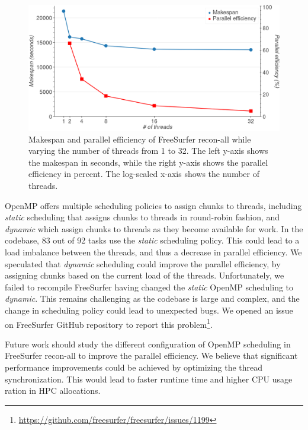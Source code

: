 \documentclass[conference]{IEEEtran}
\begin{document}
\begin{figure}
	\includegraphics[width=\linewidth]{figures/makespan-freesurfer.png}
	\caption{Makespan and parallel efficiency of FreeSurfer recon-all while varying the number of threads from 1 to 32. The left y-axis shows the makespan in seconds, while the right y-axis shows the parallel efficiency in percent. The log-scaled x-axis shows the number of threads.}
	\label{fig:freesurfer-threading}
\end{figure}

OpenMP offers multiple scheduling policies to assign chunks to threads, including \textit{static} scheduling that assigns chunks to threads in round-robin fashion, and \textit{dynamic} which assign chunks to threads as they become available for work. In the codebase, 83 out of 92 tasks use the \textit{static} scheduling policy. This could lead to a load imbalance between the threads, and thus a decrease in parallel efficiency. We speculated that \textit{dynamic} scheduling could improve the parallel efficiency, by assigning chunks based on the current load of the threads. Unfortunately, we failed to recompile FreeSurfer having changed the \textit{static} OpenMP scheduling to \textit{dynamic}. This remains challenging as the codebase is large and complex, and the change in scheduling policy could lead to unexpected bugs.
We opened an issue on FreeSurfer GitHub repository to report this problem\footnote{\href{https://github.com/freesurfer/freesurfer/issues/1199}{https://github.com/freesurfer/freesurfer/issues/1199}}.
			
Future work should study the different configuration of OpenMP scheduling in FreeSurfer recon-all to improve the parallel efficiency. We believe that significant performance improvements could be achieved by optimizing the thread synchronization. This would lead to faster runtime time and higher CPU usage ration in HPC allocations.
\end{document}
